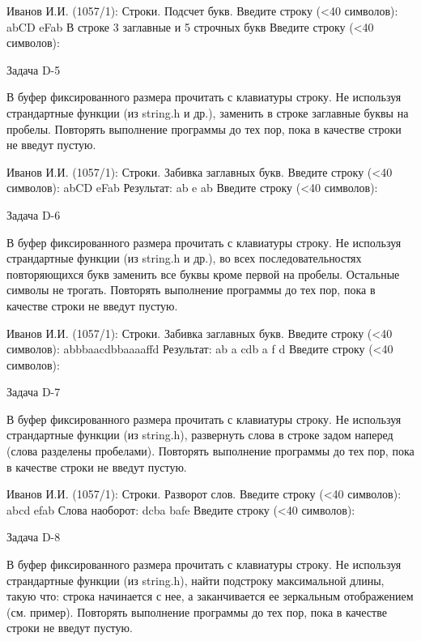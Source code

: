 Иванов И.И. (1057/1): Строки. Подсчет букв.
Введите строку (<40 символов): abCD eFab
В строке 3 заглавные и 5 строчных букв 
Введите строку (<40 символов):


Задача D-5

В буфер фиксированного размера прочитать с клавиатуры строку. Не используя
страндартные функции (из string.h и др.), заменить в строке заглавные буквы на
пробелы. Повторять выполнение программы до тех пор, пока в качестве строки не
введут пустую.

Иванов И.И. (1057/1): Строки. Забивка заглавных букв.
Введите строку (<40 символов): abCD eFab
Результат: ab   e ab
Введите строку (<40 символов):


Задача D-6

В буфер фиксированного размера прочитать с клавиатуры строку. Не используя
страндартные функции (из string.h и др.), во всех последовательностях
повторяющихся букв заменить все буквы кроме первой на пробелы. Остальные
символы не трогать. Повторять выполнение программы до тех пор, пока в качестве
строки не введут пустую.

Иванов И.И. (1057/1): Строки. Забивка заглавных букв.
Введите строку (<40 символов): abbbaacdbbaaaaffd
Результат: ab  a cdb a   f d
Введите строку (<40 символов):


Задача D-7

В буфер фиксированного размера прочитать с клавиатуры строку. Не используя
страндартные функции (из string.h), развернуть слова в строке задом наперед
(слова разделены пробелами). Повторять выполнение программы до тех пор, пока в
качестве строки не введут пустую.

Иванов И.И. (1057/1): Строки. Разворот слов.
Введите строку (<40 символов): abcd efab
Слова наоборот: dcba bafe
Введите строку (<40 символов):


Задача D-8

В буфер фиксированного размера прочитать с клавиатуры строку. Не используя
страндартные функции (из string.h), найти подстроку максимальной длины, такую
что: строка начинается с нее, а заканчивается ее зеркальным отображением (см.
пример). Повторять выполнение программы до тех пор, пока в качестве строки не
введут пустую.


